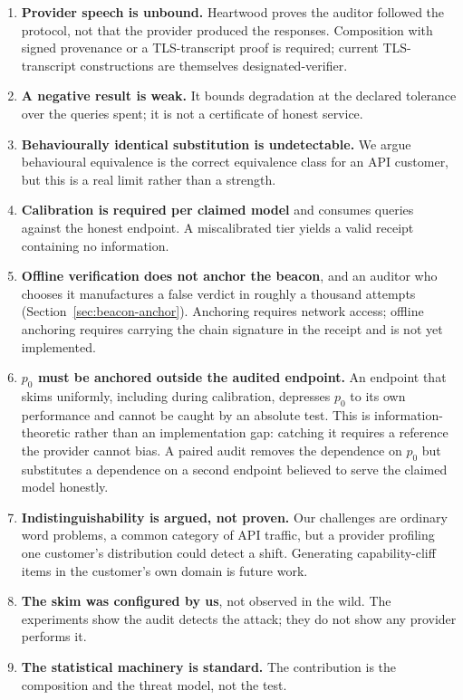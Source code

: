 \documentclass[11pt]{article}
\theoremstyle{definition}
\begin{document}
\begin{enumerate}\itemsep3pt
\item \textbf{Provider speech is unbound.} Heartwood proves the auditor followed
the protocol, not that the provider produced the responses. Composition with
signed provenance or a TLS-transcript proof is required; current
TLS-transcript constructions are themselves designated-verifier.

\item \textbf{A negative result is weak.} It bounds degradation at the declared
tolerance over the queries spent; it is not a certificate of honest service.

\item \textbf{Behaviourally identical substitution is undetectable.} We argue
behavioural equivalence is the correct equivalence class for an API customer,
but this is a real limit rather than a strength.

\item \textbf{Calibration is required per claimed model} and consumes queries
against the honest endpoint. A miscalibrated tier yields a valid receipt
containing no information.

\item \textbf{Offline verification does not anchor the beacon}, and an auditor
who chooses it manufactures a false verdict in roughly a thousand attempts
(Section~\ref{sec:beacon-anchor}). Anchoring requires network access; offline
anchoring requires carrying the chain signature in the receipt and is not yet
implemented.

\item \textbf{$p_0$ must be anchored outside the audited endpoint.} An endpoint
that skims uniformly, including during calibration, depresses $p_0$ to its own
performance and cannot be caught by an absolute test. This is
information-theoretic rather than an implementation gap: catching it requires a
reference the provider cannot bias. A paired audit removes the dependence on
$p_0$ but substitutes a dependence on a second endpoint believed to serve the
claimed model honestly.

\item \textbf{Indistinguishability is argued, not proven.} Our challenges are
ordinary word problems, a common category of API traffic, but a provider
profiling one customer's distribution could detect a shift. Generating
capability-cliff items in the customer's own domain is future work.

\item \textbf{The skim was configured by us}, not observed in the wild. The
experiments show the audit detects the attack; they do not show any provider
performs it.

\item \textbf{The statistical machinery is standard.} The contribution is the
composition and the threat model, not the test.
\end{enumerate}
\end{document}

